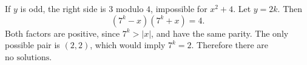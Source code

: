 If $y$ is odd, the right side is $3$ modulo $4$, impossible for $x^2+4$. Let $y=2k$. Then
\[
(7^k-x)(7^k+x)=4.
\]
Both factors are positive, since $7^k>|x|$, and have the same parity. The only possible pair is $(2,2)$, which would imply $7^k=2$. Therefore there are $\boxed{\text{no solutions}}$.
